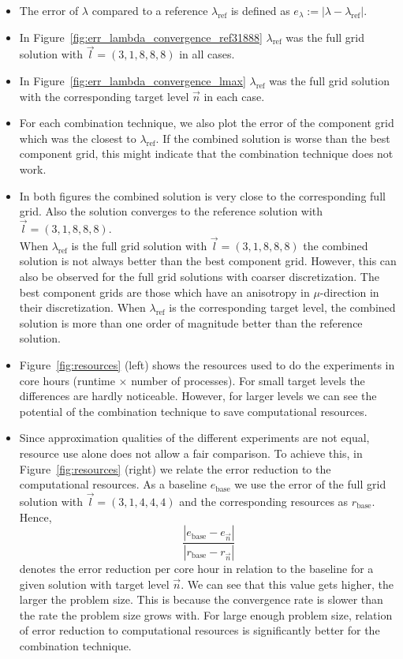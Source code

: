 \documentclass{scrartcl}
\begin{document}
\begin{itemize}
	\item The error of $\lambda$ compared to a reference $\lambda_\text{ref}$ is defined as $e_\lambda := | \lambda - \lambda_\text{ref} |$.
	\item In Figure~\ref{fig:err_lambda_convergence_ref31888} $\lambda_\text{ref}$ was the full grid solution with $\vec{l} = (3,1,8,8,8)$ in all cases.
	\item In Figure~\ref{fig:err_lambda_convergence_lmax} $\lambda_\text{ref}$ was the full grid solution with the corresponding target level $\vec n$ in each case. 
	\item For each combination technique, we also plot the error of the component grid which was the closest to $\lambda_\text{ref}$. If the combined solution is worse than the best component grid, this might indicate that the combination technique does not work.
	\item In both figures the combined solution is very close to the corresponding full grid. Also the solution converges to the reference solution with $\vec{l} = (3,1,8,8,8)$.\\
	When $\lambda_\text{ref}$ is the full grid solution with $\vec{l} = (3,1,8,8,8)$ the combined solution is not always better than the best component grid. However, this can also be observed for the full grid solutions with coarser discretization. The best component grids are those which have an anisotropy in $\mu$-direction in their discretization.
	When $\lambda_\text{ref}$ is the corresponding target level, the combined solution is more than one order of magnitude better than the reference solution.
	\item Figure~\ref{fig:resources} (left) shows the resources used to do the experiments in core hours (runtime $\times$ number of processes).
	For small target levels the differences are hardly noticeable. However, for larger levels we can see the potential of the combination technique to save computational resources.
	\item Since approximation qualities of the different experiments are not equal, resource use alone does not allow a fair comparison. To achieve this, in Figure~\ref{fig:resources} (right) we relate the error reduction to the computational resources. As a baseline $e_{\text{base}}$ we use the error of the full grid solution with $\vec{l} = (3,1,4,4,4)$ and the corresponding resources as $r_{\text{base}}$. Hence,
	\begin{equation}
		\frac{|e_{\text{base}} - e_{\vec{n}}| }{|r_{\text{base}} - r_{\vec n} |}
	\end{equation}
	denotes the error reduction per core hour in relation to the baseline for a given solution with target level $\vec{n}$.
	We can see that this value gets higher, the larger the problem size. 
	This is because the convergence rate is slower than the rate the problem size grows with. 
	For large enough problem size, relation of error reduction to computational resources is significantly better for the combination technique.
	
		
\end{itemize}
\end{document}
